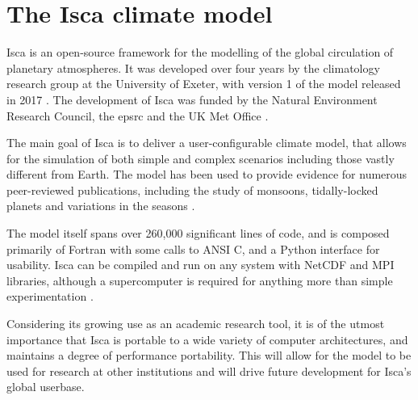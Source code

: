 \documentclass[a4paper,11pt]{report}
\begin{document}
\section{The Isca climate model}
Isca is an open-source framework for the modelling of the global circulation of planetary atmospheres. It was developed over four years by the climatology research group at the University of Exeter, with version 1 of the model released in 2017 \cite{vallis2018isca}. The development of Isca was funded by the Natural Environment Research Council, the \gls{epsrc} and the UK Met Office \cite{vallis2018isca}.
\par
The main goal of Isca is to deliver a user-configurable climate model, that allows for the simulation of both simple and complex scenarios including those vastly different from Earth. The model has been used to provide evidence for numerous peer-reviewed publications, including the study of monsoons, tidally-locked planets and variations in the seasons  \cite{penn2017thermal, thomson2018atmospheric, geen2018regime}.
 \par
 The model itself spans over 260,000 significant lines of code, and is composed primarily of Fortran with some calls to ANSI C, and a Python interface for usability. Isca can be compiled and run on any system with NetCDF and MPI libraries, although a supercomputer is required for anything more than simple experimentation \cite{vallis2018isca}. 
 \par
Considering its growing use as an academic research tool, it is of the utmost importance that Isca is portable to a wide variety of computer architectures, and maintains a degree of performance portability. This will allow for the model to be used for research at other institutions and will drive future development for Isca's global userbase.
\end{document}
